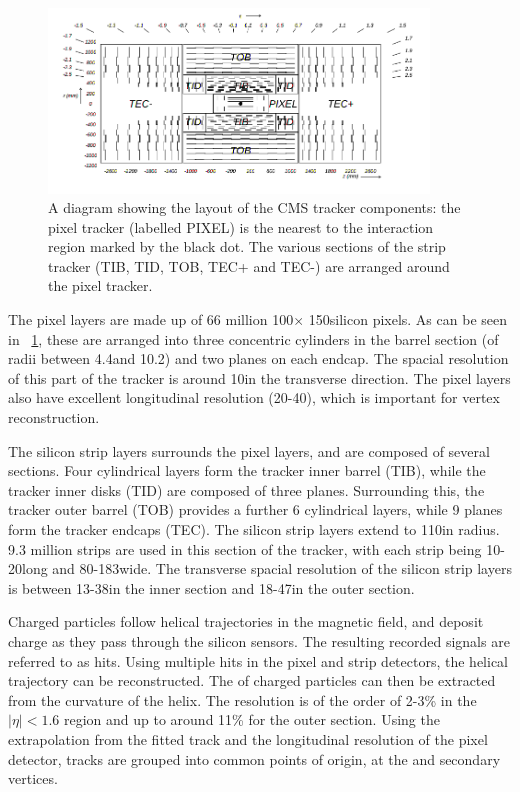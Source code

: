 \begin{figure}[h]
\centering
\includegraphics[width=0.9\textwidth]{detectorFigures/trackerSchematic.png}
\caption{A diagram showing the layout of the CMS tracker components: the pixel tracker (labelled PIXEL) is the nearest to the interaction region marked by the black dot. The various sections of the strip tracker (TIB, TID, TOB, TEC+ and TEC-) are arranged around the pixel tracker. \cite{CMSTDR}}
\label{fig:trk}
\end{figure}

The pixel layers are made up of 66 million 100\um $\times$ 150\um silicon pixels. As can be seen in \Fig~\ref{fig:trk}, these are arranged into three concentric cylinders in the barrel section (of radii between 4.4\cm and 10.2\cm) and two planes on each endcap. The spacial resolution of this part of the tracker is around 10\um in the transverse direction. The pixel layers also have excellent longitudinal resolution (20-40\um), which is important for vertex reconstruction.~\cite{trackerperformance2014}

The silicon strip layers surrounds the pixel layers, and are composed of several sections. Four cylindrical layers form the tracker inner barrel (TIB), while the tracker inner disks (TID) are composed of three planes. Surrounding this, the tracker outer barrel (TOB) provides a further 6 cylindrical layers, while 9 planes form the tracker endcaps (TEC). The silicon strip layers extend to 110\cm in radius. 9.3 million strips are used in this section of the tracker, with each strip being 10-20\cm long and 80-183\um wide. The transverse spacial resolution of the silicon strip layers is between 13-38\um in the inner section and 18-47\um in the outer section.~\cite{trackerperformance2014}

Charged particles follow helical trajectories in the \CMS magnetic field, and deposit charge as they pass through the silicon sensors. The resulting recorded signals are referred to as hits. Using multiple hits in the pixel and strip detectors, the helical trajectory can be reconstructed. The \pT of charged particles can then be extracted from the curvature of the helix. The \pT resolution is of the order of 2-3\% in the $|\eta|<1.6$ region and up to around 11\% for the outer section. Using the extrapolation from the fitted track and the longitudinal resolution of the pixel detector, tracks are grouped into common points of origin, at the \PV and secondary vertices.  

